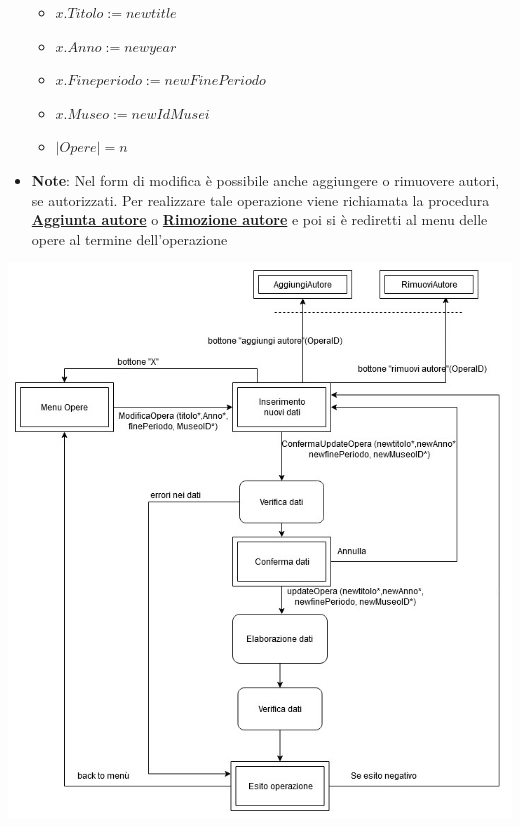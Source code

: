 \begin{itemize}
\begin{itemize}
		\item $x.Titolo := newtitle$
		\item $x.Anno := newyear$
		\item $x.Fineperiodo := newFinePeriodo$
		\item $x.Museo := newIdMusei$
		\item $|Opere| = n$
	\end{itemize}
	\item \textbf{Note}:
	Nel form di modifica è possibile anche aggiungere o rimuovere autori, se autorizzati.
	Per realizzare tale operazione viene richiamata la procedura \hyperref[AggiuntaAutore]{\textbf{Aggiunta autore}}
	o \hyperref[RimozioneAutoreOpera]{\textbf{Rimozione autore}} e poi si è rediretti al
	menu delle opere al termine dell'operazione
\end{itemize}
\includegraphics[width=\textwidth]{img/UpdateOpera.jpg}\\[1cm]


